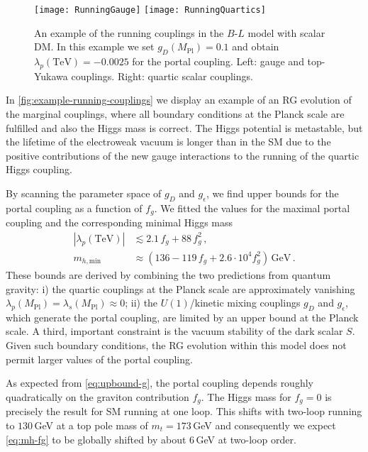 \documentclass[aps,prd,twocolumn,preprintnumbers,superscriptaddress,nobibnotes,floatfix,longbibliography]{revtex4-1}
\begin{document}
\begin{figure*}[t]
\texttt{[image: RunningGauge]} \hfill
\texttt{[image: RunningQuartics]}
\caption{An example of the running couplings in the $B$-$L$ model with scalar DM.
In this example we set $g_D(M_\text{Pl})=0.1$
and obtain $\lambda_p (\text{TeV})=-0.0025$ for the portal coupling.
Left: gauge and top-Yukawa couplings. Right: quartic scalar couplings.
}                    
\label{fig:example-running-couplings}
\end{figure*}


In \autoref{fig:example-running-couplings} we display an example of an RG evolution of the marginal couplings,
where all boundary conditions at the Planck scale are fulfilled and also the Higgs mass is correct.
The Higgs potential is metastable, but the lifetime of the electroweak vacuum is longer than in the SM due to the positive contributions of the new gauge interactions to the running of the quartic Higgs coupling.


By scanning the parameter space of $g_D$ and $g_\epsilon$, we find upper bounds for the portal coupling as a function of $f_g$.
We fitted the values for the maximal portal coupling and the corresponding minimal Higgs mass
\begin{align}
 \label{eq:lp-fg}
 |\lambda_{p} (\text{TeV})| &\lesssim 2.1\, f_g + 88\,f_g^2  \,,\\
 \label{eq:mh-fg}
 m_{h,\text{min}} &\approx (136 - 119 \, f_g + 2.6 \cdot 10^4 f_g^2 )\,\text{GeV} \,.
\end{align}
These bounds are derived by combining the two predictions from quantum gravity:
i) the quartic couplings at the Planck scale are approximately vanishing $\lambda_p(M_\text{Pl}) = \lambda_s (M_\text{Pl}) \approx 0$;
ii) the $U(1)$/kinetic mixing couplings $g_D$ and $g_\epsilon $, which generate the portal coupling, are limited by an upper bound at the Planck scale.
A third, important constraint is the vacuum stability of the dark scalar $S$. 
Given such boundary conditions, the RG evolution within this model does not permit larger values of the portal coupling. 

As expected from \eqref{eq:upbound-g}, the portal coupling depends roughly quadratically on the graviton contribution $f_g$.
The Higgs mass for $f_g=0$ is precisely the result for SM running at one loop.
This shifts with two-loop running to $130$\,GeV at a top pole mass of $m_t=173$\,GeV
and consequently we expect \eqref{eq:mh-fg} to be globally shifted by about 6\,GeV at two-loop order.
\end{document}
